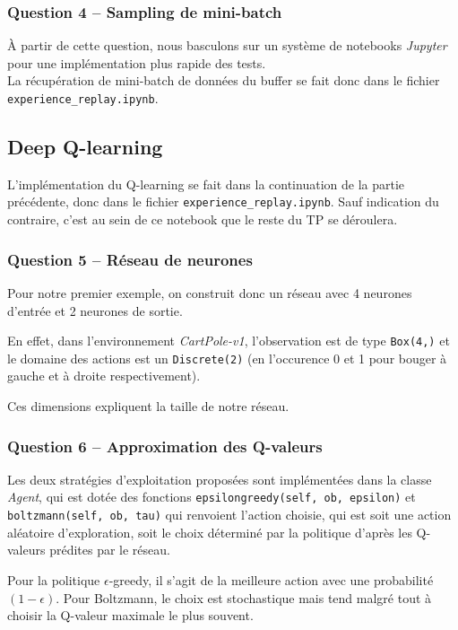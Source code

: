 \documentclass[12pt,french]{article}
\begin{document}
\subsubsection{Question 4 -- Sampling de mini-batch}

À partir de cette question, nous basculons sur un système de notebooks \textit{Jupyter} pour une implémentation plus rapide des tests. \\
La récupération de mini-batch de données du buffer se fait donc dans le fichier \texttt{experience\_replay.ipynb}.

\subsection{Deep Q-learning}

L'implémentation du Q-learning se fait dans la continuation de la partie précédente, donc dans le fichier \texttt{experience\_replay.ipynb}. Sauf indication du contraire, c'est au sein de ce notebook que le reste du TP se déroulera.

\subsubsection{Question 5 -- Réseau de neurones}

Pour notre premier exemple, on construit donc un réseau avec 4 neurones d'entrée et 2 neurones de sortie.

En effet, dans l'environnement \textit{CartPole-v1}, l'observation est de type \texttt{Box(4,)} et le domaine des actions est un \texttt{Discrete(2)} (en l'occurence 0 et 1 pour bouger à gauche et à droite respectivement).

Ces dimensions expliquent la taille de notre réseau.

\subsubsection{Question 6 -- Approximation des Q-valeurs}

Les deux stratégies d'exploitation proposées sont implémentées dans la classe \textit{Agent}, qui est dotée des fonctions \texttt{epsilongreedy(self, ob, epsilon)} et \\\texttt{boltzmann(self, ob, tau)} qui renvoient l'action choisie, qui est soit une action aléatoire d'exploration, soit le choix déterminé par la politique d'après les Q-valeurs prédites par le réseau.

Pour la politique $\epsilon$-greedy, il s'agit de la meilleure action avec une probabilité $(1 - \epsilon)$. Pour Boltzmann, le choix est stochastique mais tend malgré tout à choisir la Q-valeur maximale le plus souvent.
\end{document}
